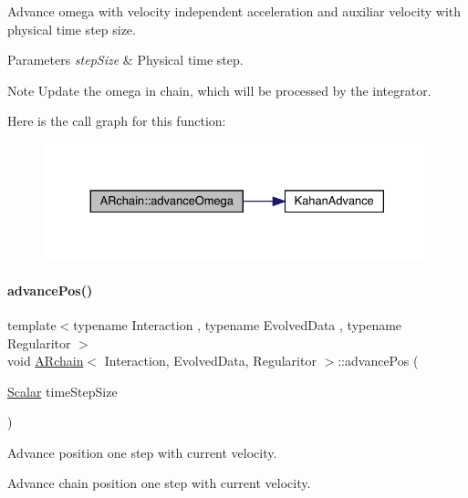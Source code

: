 Advance omega with velocity independent acceleration and auxiliar velocity with physical time step size. 
\begin{DoxyParams}{Parameters}
{\em step\+Size} & Physical time step. \\
\hline
\end{DoxyParams}
\begin{DoxyNote}{Note}
Update the omega in chain, which will be processed by the integrator. 
\end{DoxyNote}
Here is the call graph for this function\+:\nopagebreak
\begin{figure}[H]
\begin{center}
\leavevmode
\includegraphics[width=330pt]{class_a_rchain_ac54722bde3c9a15e04dd004ebcf0db5e_cgraph}
\end{center}
\end{figure}
\mbox{\label{class_a_rchain_a8d3ac75a6b4231e0859492257553316e}} 
\paragraph{\texorpdfstring{advance\+Pos()}{advancePos()}}
{\footnotesize\ttfamily template$<$typename Interaction , typename Evolved\+Data , typename Regularitor $>$ \\
void \mbox{\hyperlink{class_a_rchain}{A\+Rchain}}$<$ Interaction, Evolved\+Data, Regularitor $>$\+::advance\+Pos (\begin{DoxyParamCaption}\item[{\mbox{\hyperlink{class_a_rchain_a707e42a79e4744424a34c9007e84ee07}{Scalar}}}]{time\+Step\+Size }\end{DoxyParamCaption})}



Advance position one step with current velocity. 

Advance chain position one step with current velocity.

